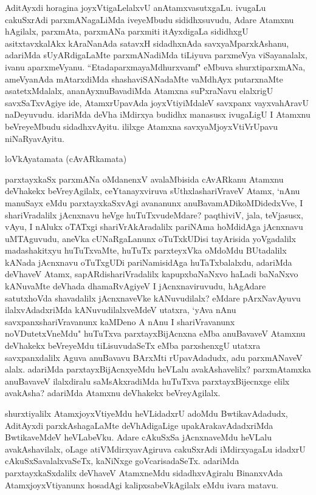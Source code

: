 \begin{artha}
AditAyxdi horagina joyxVtigaLelalxvU anAtamxvasutxgaLu. ivugaLu cakuSxrAdi parxmANagaLiMda iveyeMbudu sididhxsuvudu, Adare Atamxnu hAgilalx, parxmAta, parxmANa parxmiti itAyxdigaLa sididhxgU asitxtavxkalAkx kAraNanAda satavxH sidadhxnAda savxyaMparxkAshanu, adariMda sUyARdigaLaMte parxmANadiMda tiLiyuva parxmeVya viSayanalalx, ivanu aparxmeVyanu. ``EtadaparxmayaMdhurxvamf" eMbuva shurxtiparxmANa, ameVyanAda mAtarxdiMda shashaviSANadaMte vaMdhAyx putarxnaMte asatetxMdalalx, ananAyxnuBavadiMda Atamxna suPxraNavu elalxrigU savxSaTxvAgiye ide, AtamxrUpavAda joyxVtiyiMdaleV savxpanx vayxvahAravU naDeyuvudu. idariMda deVha iMdirxya budidhx manasusx ivugaLigU I Atamxnu beVreyeMbudu sidadhxvAyitu. ililxge Atamxna savxyaMjoyxVtiVrUpavu niNaRyavAyitu.
\end{artha}

\begin{center}%
loVkAyatamata (cAvARkamata)
\end{center}

\begin{artha}
parxtayxkaSx parxmANa oMdanenxV avalaMbisida cAvARkanu Atamxnu deVhakekx beVreyAgilalx, ceYtanayxviruva sUthxlashariVraveV Atamx, `nAnu manuSayx eMdu parxtayxkaSxvAgi avananunx anuBavamADikoMDidedxVve, I shariVradalilx jAcnxnavu heVge huTuTxvudeMdare? paqthiviV, jala, teVjasusx, vAyu, I nAlukx oTATxgi shariVrAkAradalilx pariNAma hoMdidAga jAcnxnavu uMTAguvudu, aneVka cUNaRgaLanunx oTuTxkUDisi tayArisida yoVgadalilx madashakitxyu huTuTxvaMte, huTuTx parxteyxVka oMdoMdu BUtadalilx kANada jAcnxnavu oTuTxgUDi pariNamisidAga huTaTxbalalxdu, adariMda deVhaveV Atamx, sapARdishariVradalilx kapupxbaNaNxvo haLadi baNaNxvo kANuvaMte deVhada dhamaRvAgiyeV I jAcnxnaviruvudu, hAgAdare satutxhoVda shavadalilx jAcnxnaveVke kANuvudilalx? eMdare pArxNavAyuvu ilalxvAdadxriMda kANuvudilalxveMdeV utatxra, `yAva nAnu savxpanxshariVravanunx kaMDeno A nAnu I shariVravanunx noVDutetxVneMdu" huTuTxva parxtayxBijAcnxna eMba anuBavaveV Atamxnu deVhakekx beVreyeMdu tiLisuvudaSeTx eMba parxshenxgU utatxra savxpanxdalilx Aguva anuBavavu BArxMti rUpavAdadudx, adu parxmANaveV alalx. adariMda parxtayxBijAcnxyeMdu heVLalu avakAshavelilx? parxmAtamxka anuBavaveV ilalxdiralu saMsAkxradiMda huTuTxva parxtayxBijecnxge elilx avakAsha? adariMda Atamxnu deVhakekx beVreyAgilalx. 
\end{artha}

\begin{artha}
shurxtiyalilx AtamxjoyxVtiyeMdu heVLidadxrU adoMdu BwtikavAdadudx, AditAyxdi parxkAshagaLaMte deVhAdigaLige upakArakavAdadxriMda BwtikaveMdeV heVLabeVku. Adare cAkuSxSa jAcnxnaveMdu heVLalu avakAshavilalx, oLage atiVMdirxyavAgiruva cakuSxrAdi iMdirxyagaLu idadxrU cAkuSxSavalalxvaSeTx, kaNiNxge goVcarisadaSeTx. adariMda parxtayxkaSxdalilx deVhaveV AtamxneMdu sidadhxvAgiralu BinanxvAda AtamxjoyxVtiyanunx hosadAgi kalipxsabeVkAgilalx eMdu ivara matavu.
\end{artha}

